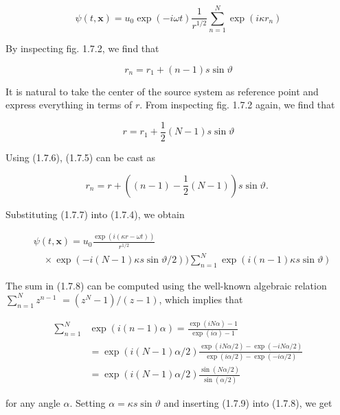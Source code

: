 \documentclass{article}
\begin{document}
\begin{equation*}
\psi(t, \boldsymbol{x})=u_{0} \exp (-i \omega t) \frac{1}{r^{1 / 2}} \sum_{n=1}^{N} \exp \left(i \kappa r_{n}\right) \tag{1.7.4}
\end{equation*}
 

By inspecting fig. 1.7.2, we find that
 
\begin{equation*}
r_{n}=r_{1}+(n-1) s \sin \vartheta \tag{1.7.5}
\end{equation*}
 

It is natural to take the center of the source system as reference point and express everything in terms of $r$. From inspecting fig. 1.7.2 again, we find that
 
\begin{equation*}
r=r_{1}+\frac{1}{2}(N-1) s \sin \vartheta \tag{1.7.6}
\end{equation*}
 

Using (1.7.6), (1.7.5) can be cast as
 
\begin{equation*}
r_{n}=r+\left((n-1)-\frac{1}{2}(N-1)\right) s \sin \vartheta \text {. } \tag{1.7.7}
\end{equation*}
 

Substituting (1.7.7) into (1.7.4), we obtain
 
\begin{align*}
& \psi(t, \boldsymbol{x})=u_{0} \frac{\exp (i(\kappa r-\omega t))}{r^{1 / 2}}  \tag{1.7.8}\\
&\quad \times \exp (-i(N-1) \kappa s \sin \vartheta / 2)) \sum_{n=1}^{N} \exp (i(n-1) \kappa s \sin \vartheta)
\end{align*}
 

The sum in (1.7.8) can be computed using the well-known algebraic relation $\sum_{n=1}^{N} z^{n-1}$ $=\left(z^{N}-1\right) /(z-1)$, which implies that
 
\begin{align*}
\sum_{n=1}^{N} & \exp (i(n-1) \alpha)=\frac{\exp (i N \alpha)-1}{\exp (i \alpha)-1}  \tag{1.7.9}\\
& =\exp (i(N-1) \alpha / 2) \frac{\exp (i N \alpha / 2)-\exp (-i N \alpha / 2)}{\exp (i \alpha / 2)-\exp (-i \alpha / 2)} \\
& =\exp (i(N-1) \alpha / 2) \frac{\sin (N \alpha / 2)}{\sin (\alpha / 2)}
\end{align*}
 
for any angle $\alpha$. Setting $\alpha=\kappa s \sin \vartheta$ and inserting (1.7.9) into (1.7.8), we get
 
\end{document}
